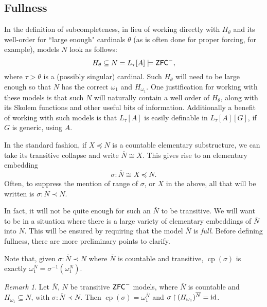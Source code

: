 \documentclass{amsart}
\theoremstyle{definition}
\theoremstyle{remark}
\newtheorem{remark}[theorem]{Remark}
\newcommand{\N}{{\overline{N}}}
\newcommand{\ZFC}{\textup{\ensuremath{\textsf{ZFC}}}}
\newcommand{\id}{\textup{\ensuremath{\text{id}}}}
\DeclareMathOperator{\cp}{cp}
\newcommand{\rest}{\mathbin{\upharpoonright}}
\newcommand{\TC}[1]{\mathrm{TC}(\{ #1 \})}
\begin{document}
\subsection{Fullness}
\label{subsec:fullness}
In the definition of subcompleteness, in lieu of working directly with $H_\theta$ and its well-order for ``large enough" cardinals $\theta$ (as is often done for proper forcing, for example), models $N$ look as follows: 
	$$H_\theta \subseteq N = L_\tau[A] \models \ZFC^-,$$
where $\tau>\theta$ is a (possibly singular) cardinal. Such $H_\theta$ will need to be large enough so that $N$ has the correct $\omega_1$ and $H_{\omega_1}$. One justification for working with these models is that such $N$ will naturally contain a well order of $H_\theta$, along with its Skolem functions and other useful bits of information. Additionally a benefit of working with such models is that $L_\tau[A]$ is easily definable in $L_\tau[A][G]$, if $G$ is generic, using $A$.

In the standard fashion, if $X \preccurlyeq N$ is a countable elementary substructure, we can take its transitive collapse and write $\N \cong X$. This gives rise to an elementary embedding 
$$\sigma: \N \cong X \preccurlyeq N.$$
Often, to suppress the mention of range of $\sigma$, or $X$ in the above, all that will be written is $\sigma: \N \prec N$.
	
In fact, it will not be quite enough for such an $\N$ to be transitive. We will want to be in a
situation where there is a large variety of elementary embeddings of \(\N\) into \(N\).
This will be ensured by requiring that the model \(\N\) is \emph{full}.
Before defining fullness, there are more preliminary points to clarify.

Note that, given $\sigma: \N \prec N$ where $\N$ is countable and transitive, $\cp(\sigma)$ is exactly $\omega_1^{\N} = \sigma^{-1}(\omega_1^N)$.

\begin{remark} \label{remark:CPofourEmbeddings} Let $\N$, $N$ be transitive $\ZFC^-$ models, where $\N$ is countable and $H_{\omega_1} \subseteq N$, with $\sigma: \N \prec N$. Then $\cp(\sigma)=\omega_1^{\N}$ and $\sigma \rest (H_{\omega_1})^{\N} = \id$. \end{remark}
%
\end{document}

